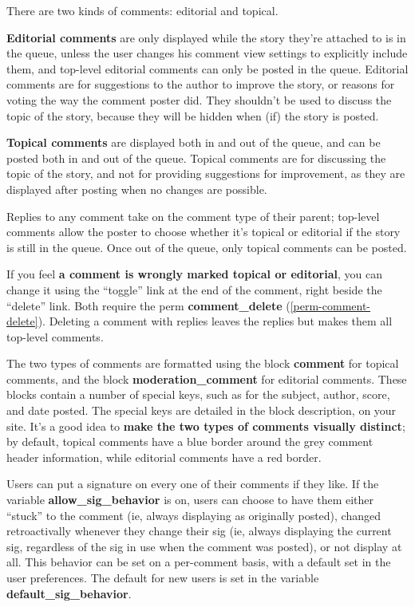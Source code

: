 There are two kinds of comments: editorial and topical.  

{\bf Editorial comments} are only displayed while the story they're attached to is in the queue, unless the user changes his comment view settings to explicitly include them, and top-level editorial comments can only be posted in the queue.  Editorial comments are for suggestions to the author to improve the story, or reasons for voting the way the comment poster did.  They shouldn't be used to discuss the topic of the story, because they will be hidden when (if) the story is posted.  

{\bf Topical comments} are displayed both in and out of the queue, and can be posted both in and out of the queue.  Topical comments are for discussing the topic of the story, and not for providing suggestions for improvement, as they are displayed after posting when no changes are possible.  

Replies to any comment take on the comment type of their parent; top-level comments allow the poster to choose whether it's topical or editorial if the story is still in the queue. Once out of the queue, only topical comments can be posted.

If you feel {\bf a comment is wrongly marked topical or editorial}, you can change it using the ``toggle'' link at the end of the comment, right beside the ``delete'' link.  Both require the perm {\bf comment\_delete} (\ref{perm-comment-delete}).  Deleting a comment with replies leaves the replies but makes them all top-level comments.

The two types of comments are formatted using the block {\bf comment} for topical comments, and the block {\bf moderation\_comment} for editorial comments.  These blocks contain a number of special keys, such as for the subject, author, score, and date posted.  The special keys are detailed in the block description, on your site.  It's a good idea to {\bf make the two types of comments visually distinct}; by default, topical comments have a blue border around the grey comment header information, while editorial comments have a red border.

Users can put a signature on every one of their comments if they like.  If the variable {\bf allow\_sig\_behavior} is on, users can choose to have them either ``stuck'' to the comment (ie, always displaying as originally posted), changed retroactivally whenever they change their sig (ie, always displaying the current sig, regardless of the sig in use when the comment was posted), or not display at all.  This behavior can be set on a per-comment basis, with a default set in the user preferences.  The default for new users is set in the variable {\bf default\_sig\_behavior}.

